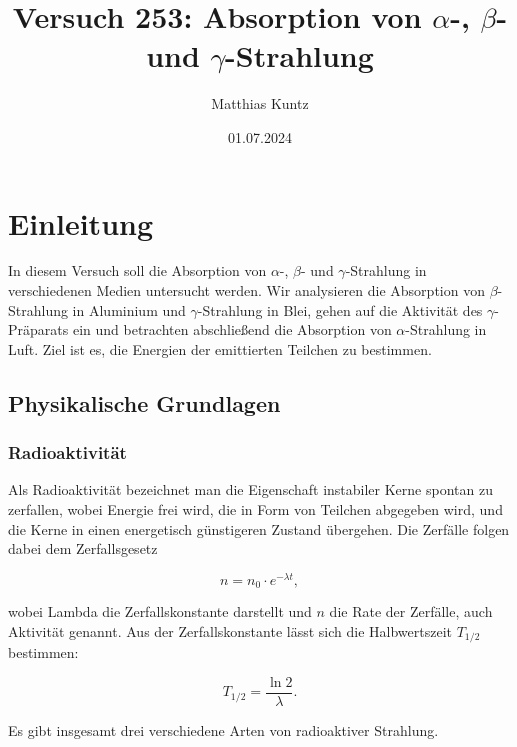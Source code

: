 \documentclass{article}
\title{Versuch 253: Absorption von $\alpha$-, $\beta$- und $\gamma$-Strahlung}
\author{Matthias Kuntz}
\date{01.07.2024}
\begin{document}
\maketitle

\tableofcontents

\newpage

\section{Einleitung}

In diesem Versuch soll die Absorption von $\alpha$-, $\beta$- und $\gamma$-Strahlung in verschiedenen Medien untersucht werden. Wir analysieren die Absorption von $\beta$-Strahlung in Aluminium und $\gamma$-Strahlung in Blei, gehen auf die Aktivität des $\gamma$-Präparats ein und betrachten abschließend die Absorption von $\alpha$-Strahlung in Luft. Ziel ist es, die Energien der emittierten Teilchen zu bestimmen.


\subsection{Physikalische Grundlagen}

\subsubsection{Radioaktivität}

Als Radioaktivität bezeichnet man die Eigenschaft instabiler Kerne spontan zu zerfallen, wobei Energie frei wird, die in Form von Teilchen abgegeben wird, und die Kerne in einen energetisch günstigeren Zustand übergehen. Die Zerfälle folgen dabei dem Zerfallsgesetz

\begin{equation}
    n = n_0 \cdot e^{-\lambda t},
    \label{eq:Zerfallsgesetz}
\end{equation}

wobei Lambda die Zerfallskonstante darstellt und $n$ die Rate der Zerfälle, auch Aktivität genannt. Aus der Zerfallskonstante lässt sich die Halbwertszeit $T_{1/2}$ bestimmen:

\begin{equation}
    T_{1/2} = \frac{\ln 2}{\lambda}.
    \label{eq:Halbwertszeit}
\end{equation}


Es gibt insgesamt drei verschiedene Arten von radioaktiver Strahlung.
\end{document}

